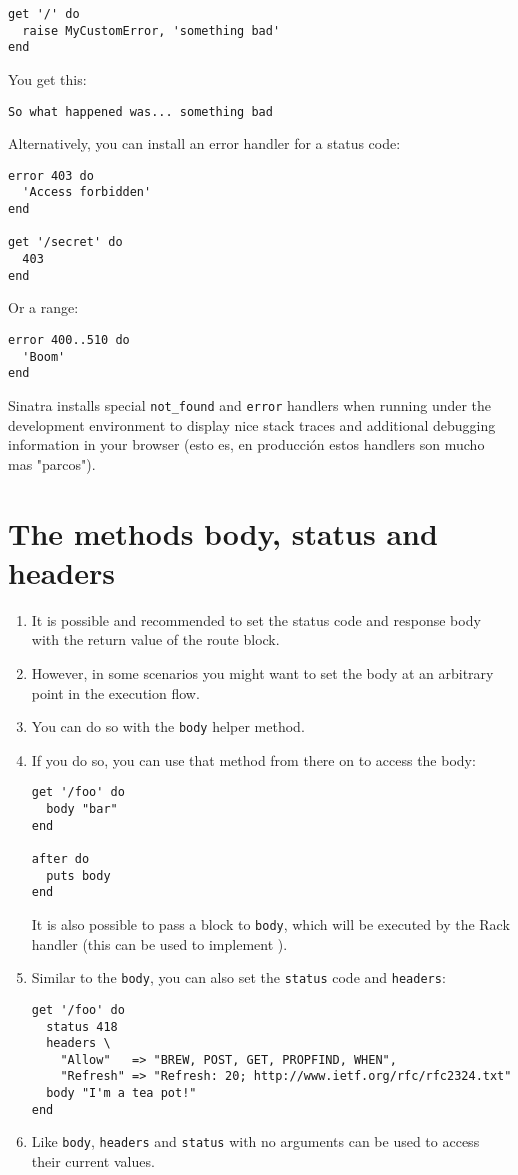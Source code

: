 \begin{verbatim}
get '/' do
  raise MyCustomError, 'something bad'
end
\end{verbatim}
You get this:

\begin{verbatim}
So what happened was... something bad
\end{verbatim}
Alternatively, you can install an error handler for a status code:

\begin{verbatim}
error 403 do
  'Access forbidden'
end

get '/secret' do
  403
end
\end{verbatim}
Or a range:

\begin{verbatim}
error 400..510 do
  'Boom'
end
\end{verbatim}
Sinatra installs special \verb|not_found| and \verb|error| handlers 
when running under the development environment to display nice stack
traces and additional debugging information in your browser (esto es,
en producción estos handlers son mucho mas "parcos").


\section{The methods body, status and headers}
\begin{enumerate}
\item 
It is possible and recommended to set the status code and response
body with the return value of the route block. 
\item 
However, in some
scenarios you might want to set the body at an arbitrary point in
the execution flow. 
\item 
You can do so with the \verb|body| helper method. 
\item 
If
you do so, you can use that method from there on to access the body:
\begin{verbatim}
get '/foo' do
  body "bar"
end

after do
  puts body
end
\end{verbatim}
It is also possible to pass a block to \verb|body|, which will be executed
by the Rack handler (this can be used to implement ).

\item 
Similar to the \verb|body|, you can also set the \verb|status| code and \verb|headers|:

\begin{verbatim}
get '/foo' do
  status 418
  headers \
    "Allow"   => "BREW, POST, GET, PROPFIND, WHEN",
    "Refresh" => "Refresh: 20; http://www.ietf.org/rfc/rfc2324.txt"
  body "I'm a tea pot!"
end
\end{verbatim}
\item 
Like \verb|body|, \verb|headers| and \verb|status| with no arguments
can be used to access their current values.
\end{enumerate}


